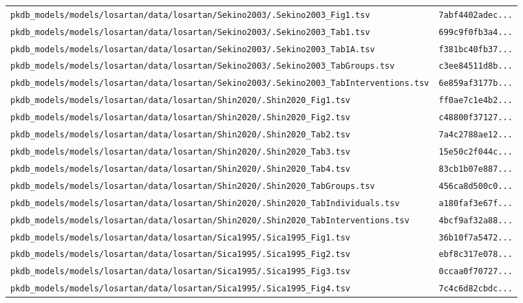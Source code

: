 \documentclass{article}
\begin{document}
\begin{longtable}{ll}
\texttt{pkdb\_models/models/losartan/data/losartan/Sekino2003/.Sekino2003\_Fig1.tsv} & \texttt{7abf4402adec...} \\
\texttt{pkdb\_models/models/losartan/data/losartan/Sekino2003/.Sekino2003\_Tab1.tsv} & \texttt{699c9f0fb3a4...} \\
\texttt{pkdb\_models/models/losartan/data/losartan/Sekino2003/.Sekino2003\_Tab1A.tsv} & \texttt{f381bc40fb37...} \\
\texttt{pkdb\_models/models/losartan/data/losartan/Sekino2003/.Sekino2003\_TabGroups.tsv} & \texttt{c3ee84511d8b...} \\
\texttt{pkdb\_models/models/losartan/data/losartan/Sekino2003/.Sekino2003\_TabInterventions.tsv} & \texttt{6e859af3177b...} \\
\texttt{pkdb\_models/models/losartan/data/losartan/Shin2020/.Shin2020\_Fig1.tsv} & \texttt{ff0ae7c1e4b2...} \\
\texttt{pkdb\_models/models/losartan/data/losartan/Shin2020/.Shin2020\_Fig2.tsv} & \texttt{c48800f37127...} \\
\texttt{pkdb\_models/models/losartan/data/losartan/Shin2020/.Shin2020\_Tab2.tsv} & \texttt{7a4c2788ae12...} \\
\texttt{pkdb\_models/models/losartan/data/losartan/Shin2020/.Shin2020\_Tab3.tsv} & \texttt{15e50c2f044c...} \\
\texttt{pkdb\_models/models/losartan/data/losartan/Shin2020/.Shin2020\_Tab4.tsv} & \texttt{83cb1b07e887...} \\
\texttt{pkdb\_models/models/losartan/data/losartan/Shin2020/.Shin2020\_TabGroups.tsv} & \texttt{456ca8d500c0...} \\
\texttt{pkdb\_models/models/losartan/data/losartan/Shin2020/.Shin2020\_TabIndividuals.tsv} & \texttt{a180faf3e67f...} \\
\texttt{pkdb\_models/models/losartan/data/losartan/Shin2020/.Shin2020\_TabInterventions.tsv} & \texttt{4bcf9af32a88...} \\
\texttt{pkdb\_models/models/losartan/data/losartan/Sica1995/.Sica1995\_Fig1.tsv} & \texttt{36b10f7a5472...} \\
\texttt{pkdb\_models/models/losartan/data/losartan/Sica1995/.Sica1995\_Fig2.tsv} & \texttt{ebf8c317e078...} \\
\texttt{pkdb\_models/models/losartan/data/losartan/Sica1995/.Sica1995\_Fig3.tsv} & \texttt{0ccaa0f70727...} \\
\texttt{pkdb\_models/models/losartan/data/losartan/Sica1995/.Sica1995\_Fig4.tsv} & \texttt{7c4c6d82cbdc...} \\

\end{longtable}
\end{document}
